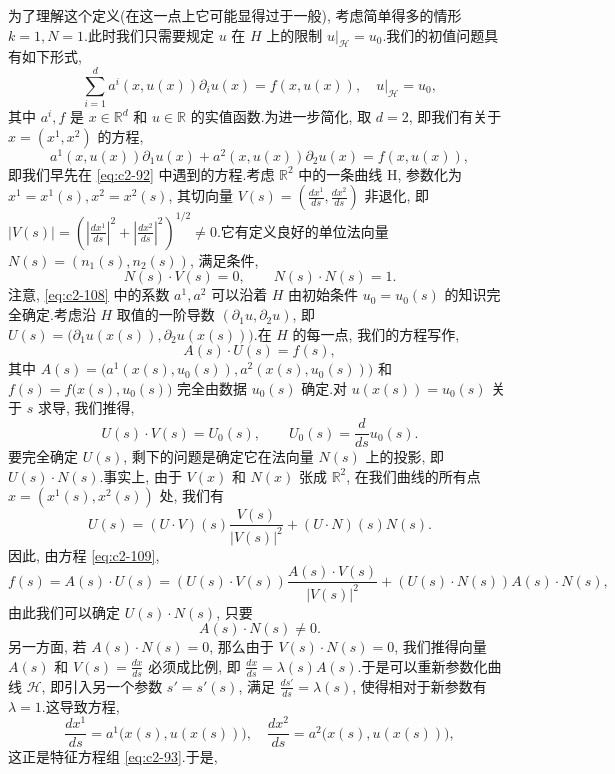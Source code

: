为了理解这个定义(在这一点上它可能显得过于一般), 考虑简单得多的情形 $k = 1, N = 1$.此时我们只需要规定 $u$ 在 $H$ 上的限制 $u|_{\mathcal{H}} = u_{0}$.我们的初值问题具有如下形式,
\begin{equation}
\sum_{i = 1}^{d} a^{i}(x, u(x)) \partial_{i} u(x) = f(x, u(x)), \quad u|_{\mathcal{H}} = u_{0}, \label{eq:c2-107}
\end{equation}
其中 $a^{i}, f$ 是 $x \in \mathbb{R}^{d}$ 和 $u \in \mathbb{R}$ 的实值函数.为进一步简化, 取 $d = 2$, 即我们有关于 $x = (x^{1}, x^{2})$ 的方程,
\begin{equation}
a^{1}(x, u(x)) \partial_{1} u(x) + a^{2}(x, u(x)) \partial_{2} u(x) = f(x, u(x)), \label{eq:c2-108}
\end{equation}
即我们早先在 \eqref{eq:c2-92} 中遇到的方程.考虑 $\mathbb{R}^{2}$ 中的一条曲线 H, 参数化为 $x^{1} = x^{1}(s), x^{2} = x^{2}(s)$, 其切向量 $V(s) = (\frac{d x^{1}}{d s}, \frac{d x^{2}}{d s})$ 非退化, 即 $|V(s)| = (|\frac{d x^{1}}{d s}|^{2} + |\frac{d x^{2}}{d s}|^{2})^{1/2} \neq 0$.它有定义良好的单位法向量 $N(s) = (n_{1}(s), n_{2}(s))$, 满足条件,
\[
N(s) \cdot V(s) = 0, \qquad N(s) \cdot N(s) = 1.
\]
注意, \eqref{eq:c2-108} 中的系数 $a^{1}, a^{2}$ 可以沿着 $H$ 由初始条件 $u_{0} = u_{0}(s)$ 的知识完全确定.考虑沿 $H$ 取值的一阶导数 $(\partial_{1} u, \partial_{2} u)$, 即 $U(s) = \bigl(\partial_{1} u(x(s)), \partial_{2} u(x(s))\bigr)$.在 $H$ 的每一点, 我们的方程写作,
\begin{equation}
A(s) \cdot U(s) = f(s), \label{eq:c2-109}
\end{equation}
其中 $A(s) = \bigl(a^{1}(x(s), u_{0}(s)), a^{2}(x(s), u_{0}(s))\bigr)$ 和 $f(s) = f\bigl(x(s), u_{0}(s)\bigr)$ 完全由数据 $u_{0}(s)$ 确定.对 $u(x(s)) = u_{0}(s)$ 关于 $s$ 求导, 我们推得,
\[
U(s) \cdot V(s) = U_{0}(s), \qquad U_{0}(s) = \frac{d}{d s} u_{0}(s).
\]
要完全确定 $U(s)$, 剩下的问题是确定它在法向量 $N(s)$ 上的投影, 即 $U(s) \cdot N(s)$.事实上, 由于 $V(x)$ 和 $N(x)$ 张成 $\mathbb{R}^{2}$, 在我们曲线的所有点 $x = (x^{1}(s), x^{2}(s))$ 处, 我们有
\begin{equation}
U(s) = (U \cdot V)(s) \frac{V(s)}{|V(s)|^{2}} + (U \cdot N)(s) N(s). \label{eq:c2-110}
\end{equation}
因此, 由方程 \eqref{eq:c2-109},
\[
f(s) = A(s) \cdot U(s) = (U(s) \cdot V(s)) \frac{A(s) \cdot V(s)}{|V(s)|^{2}} + (U(s) \cdot N(s)) A(s) \cdot N(s),
\]
由此我们可以确定 $U(s) \cdot N(s)$, 只要
\begin{equation}
A(s) \cdot N(s) \neq 0. \label{eq:c2-111}
\end{equation}
另一方面, 若 $A(s) \cdot N(s) = 0$, 那么由于 $V(s) \cdot N(s) = 0$, 我们推得向量 $A(s)$ 和 $V(s) = \frac{d x}{d s}$ 必须成比例, 即 $\frac{d x}{d s} = \lambda(s) A(s)$.于是可以重新参数化曲线 $\mathcal{H}$, 即引入另一个参数 $s' = s'(s)$, 满足 $\frac{d s'}{d s} = \lambda(s)$, 使得相对于新参数有 $\lambda = 1$.这导致方程,
\[
\frac{d x^{1}}{d s} = a^{1}\bigl(x(s), u(x(s))\bigr), \quad \frac{d x^{2}}{d s} = a^{2}\bigl(x(s), u(x(s))\bigr),
\]
这正是特征方程组 \eqref{eq:c2-93}.于是,

